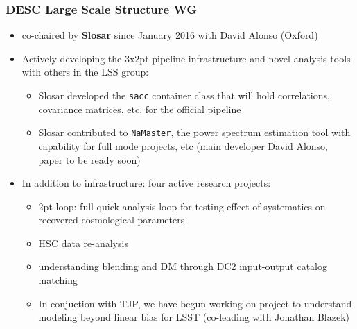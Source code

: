 \documentclass[aspectratio=169]{beamer}
\begin{document}
\begin{frame}
\frametitle {DESC Large Scale Structure WG}

    \begin{itemize}  
        \item co-chaired by \textbf{Slosar} since January 2016 with David
            Alonso (Oxford)

        \item Actively developing the 3x2pt pipeline infrastructure and
            novel analysis tools with others in the LSS group:
            \begin{itemize}
                \item Slosar developed the \texttt{sacc} container class that will
                    hold correlations, covariance matrices, etc. for the official
                    pipeline

                \item Slosar contributed to \texttt{NaMaster}, the power
                    spectrum estimation tool with capability for full mode projects,
                    etc (main developer David Alonso, paper to be ready soon)
            \end{itemize}

        \item In addition to infrastructure: four active research projects:

            \begin{itemize}
                \item 2pt-loop: full quick analysis loop for testing effect of 
                    systematics on recovered cosmological parameters
                \item HSC data re-analysis
                \item understanding blending and DM through DC2 input-output catalog
                    matching

                \item In conjuction with TJP, we have begun working on project to
                    understand modeling beyond linear bias for LSST (co-leading with
                    Jonathan Blazek)

            \end{itemize}


    \end{itemize}

\end{frame}
\end{document}
